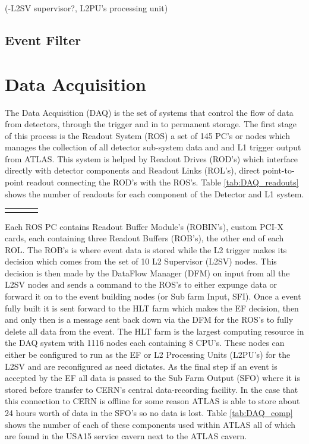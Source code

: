 		(-L2SV supervisor?, L2PU's processing unit)



	\subsection*{Event Filter}

	



\section{Data Acquisition}
\label{sec:trig_DAQ}

	The Data Acquisition (DAQ) is the set of systems that control the flow of data from detectors, through the trigger and in to permanent storage. The first stage of this process is the Readout System (ROS) a set of 145 PC's or nodes which manages the collection of all detector sub-system data and and L1 trigger output from ATLAS. This system is helped by Readout Drives (ROD's) which interface directly with detector components and Readout Links (ROL's), direct point-to-point readout connecting the ROD's with the ROS's. Table \ref{tab:DAQ_readouts} shows the number of readouts for each component of the Detector and L1 system.

	\begin{tabular}{ | l | c | c | c | }
		\hline

    	\hline
    	\label{tab:DAQ_readouts}
  	\end{tabular}

  	Each ROS PC contains Readout Buffer Module's (ROBIN's), custom PCI-X cards, each containing three Readout Buffers (ROB's), the other end of each ROL. The ROB's is where event data is stored while the L2 trigger makes its decision which comes from the set of 10 L2 Supervisor (L2SV) nodes. This decision is then made by the DataFlow Manager (DFM) on input from all the L2SV nodes and sends a command to the ROS's to either expunge data or forward it on to the event building nodes (or Sub farm Input, SFI). Once a event fully built it is sent forward to the HLT farm which makes the EF decision, then and only then is a message sent back down via the DFM for the ROS's to fully delete all data from the event. The HLT farm is the largest computing resource in the DAQ system with 1116 nodes each containing 8 CPU's. These nodes can either be configured to run as the EF or L2 Processing Units (L2PU's) for the L2SV and are reconfigured as need dictates. As the final step if an event is accepted by the EF all data is passed to the Sub Farm Output (SFO) where it is stored before transfer to CERN's central data-recording facility. In the case that this connection to CERN is offline for some reason ATLAS is able to store about 24 hours worth of data in the SFO's so no data is lost.
  	Table \ref{tab:DAQ_comp} shows the number of each of these components used within ATLAS all of which are found in the USA15 service cavern next to the ATLAS cavern.



